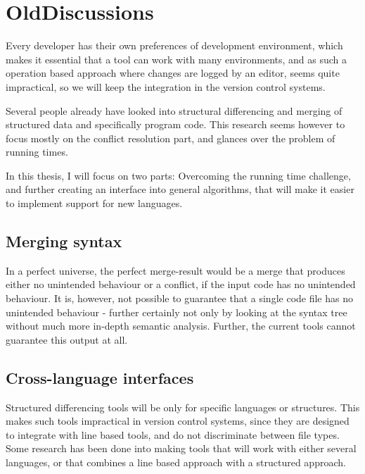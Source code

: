 \documentclass[11pt]{article}
\begin{document}
\clearpage
\section{OldDiscussions}

Every developer has their own preferences of development environment, which makes it essential that a tool can work with many environments, and as such a operation based approach where changes are logged by an editor, seems quite impractical, so we will keep the integration in the version control systems. 

Several people already have looked into structural differencing and merging of structured data and specifically program code. This research seems however to focus mostly on the conflict resolution part, and glances over the problem of running times. 

In this thesis, I will focus on two parts: Overcoming the running time challenge, and further creating an interface into general algorithms, that will make it easier to implement support for new languages.



\subsection{Merging syntax}
In a perfect universe, the perfect merge-result would be a merge that produces either no unintended behaviour or a conflict, if the input code has no unintended behaviour. It is, however, not possible to guarantee that a single code file has no unintended behaviour - further certainly not only by looking at the syntax tree without much more in-depth semantic analysis. Further, the current tools cannot guarantee this output at all.




\subsection{Cross-language interfaces}
Structured differencing tools will be only for specific languages or structures. This makes such tools impractical in version control systems, since they are designed to integrate with line based tools, and do not discriminate between file types. Some research has been done into making tools that will work with either several languages, or that combines a line based approach with a structured approach.
\end{document}
